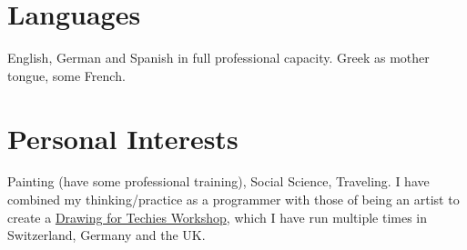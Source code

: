 \documentclass[10pt]{article} %
\begin{document}
\hfill
\begin{minipage}[t]{0.44\textwidth} %
\vspace{0pt} %


\section{Languages} 
\normalsize{English, German and Spanish in full professional capacity. Greek as mother tongue, some French.}\\

\section{Personal Interests} 
    \normalsize{Painting (have some professional training), Social Science, Traveling. I have combined my thinking/practice as a programmer with those of being an artist to create a \href{https://medium.com/@_sandtweets/learn-drawing-and-programming-at-the-same-time-at-mozfest-2017-6a9f8627b72}{Drawing for Techies Workshop}, which I have run multiple times in Switzerland, Germany and the UK.}\\
	
\end{minipage} %
\end{document}
